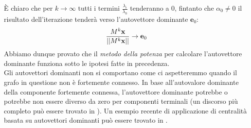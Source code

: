 È chiaro che per $k \to \infty$ tutti i termini $\frac{\lambda_i}{\lambda_0}$ tenderanno a 0, fintanto che $\alpha_0 \neq 0$ il risultato dell'iterazione tenderà verso l'autovettore dominante $\textbf{e}_0$:
\begin{equation*}
    \frac{M^k\textbf{x}}{\lvert\lvert M^k\textbf{x} \rvert\rvert} \to \textbf{e}_0
\end{equation*}
Abbiamo dunque provato che il \textit{metodo della potenza} per calcolare l'autovettore dominante funziona sotto le ipotesi fatte in precedenza.\\
Gli autovettori dominanti non si comportano come ci aspetteremmo quando il grafo in questione non è fortemente connesso. In base all'autovalore dominante della componente fortemente connessa, l'autovettore dominante potrebbe o potrebbe non essere diverso da zero per componenti terminali (un discorso più completo può essere trovato in %
).
Un esempio recente di applicazione di centralità basata su autovettori dominanti può essere trovato in %
.
